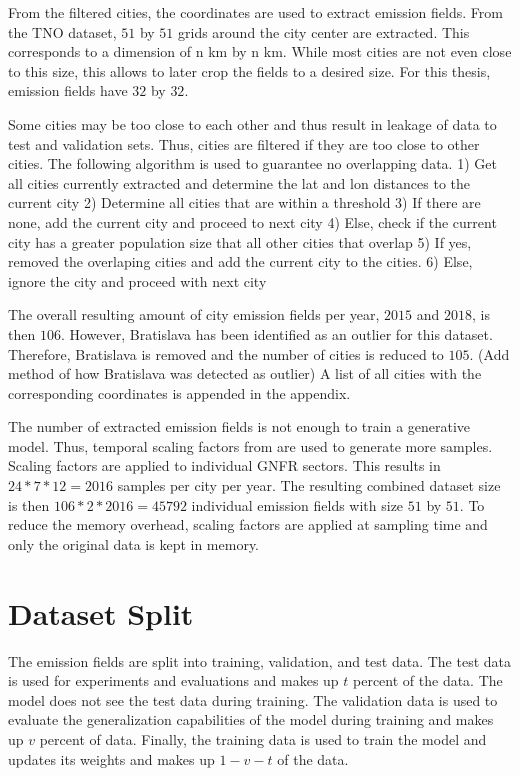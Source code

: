 From the filtered cities, the coordinates are used to extract emission fields.
From the TNO dataset, $51$ by $51$ grids around the city center are extracted.
This corresponds to a dimension of n km by n km.
While most cities are not even close to this size, this allows to later crop the fields to a desired size.
For this thesis, emission fields have $32$ by $32$.

Some cities may be too close to each other and thus result in leakage of data to test and validation sets.
Thus, cities are filtered if they are too close to other cities.
The following algorithm is used to guarantee no overlapping data.
1) Get all cities currently extracted and determine the lat and lon distances to the current city
2) Determine all cities that are within a threshold
3) If there are none, add the current city and proceed to next city
4) Else, check if the current city has a greater population size that all other cities that overlap
5) If yes, removed the overlaping cities and add the current city to the cities.
6) Else, ignore the city and proceed with next city

The overall resulting amount of city emission fields per year, $2015$ and $2018$, is then $106$.
However, Bratislava has been identified as an outlier for this dataset.
Therefore, Bratislava is removed and the number of cities is reduced to $105$.
(Add method of how Bratislava was detected as outlier)
A list of all cities with the corresponding coordinates is appended in the appendix.

The number of extracted emission fields is not enough to train a generative model.
Thus, temporal scaling factors from \parencite{ScalingFactors} are used to generate more samples.
Scaling factors are applied to individual GNFR sectors.
This results in $24 * 7 * 12 = 2016$ samples per city per year.
The resulting combined dataset size is then $106 * 2 * 2016 = 45792$ individual emission fields with size $51$ by $51$.
To reduce the memory overhead, scaling factors are applied at sampling time and only the original data is kept in memory.

\section{Dataset Split}
The emission fields are split into training, validation, and test data.
The test data is used for experiments and evaluations and makes up $t$ percent of the data.
The model does not see the test data during training.
The validation data is used to evaluate the generalization capabilities of the model during training and makes up $v$ percent of data.
Finally, the training data is used to train the model and updates its weights and makes up $1 - v - t$ of the data.

